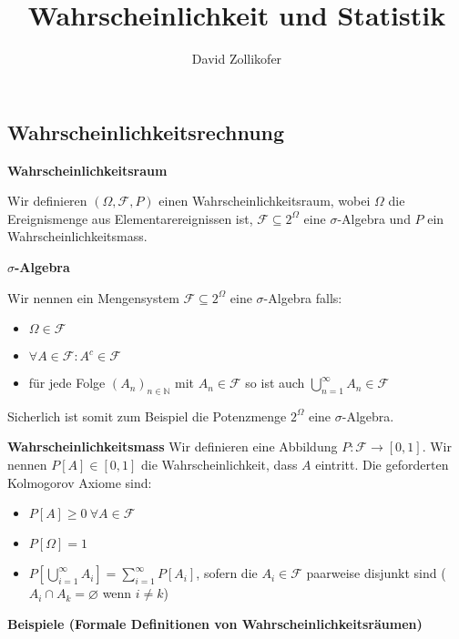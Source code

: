 \documentclass[25pt]{sciposter}
\title{\huge{Wahrscheinlichkeit und Statistik}}
\author{\large{David Zollikofer}}
\newcommand{\N}{\mathbb{N}}
\newcommand{\F}{\mathcal{F}}
\newenvironment{method}[1]{\begin{mdframed}[backgroundcolor=blue!10,innertopmargin=15pt, innerbottommargin=15pt]
		\textbf{#1 }
	}
	{ 
	\end{mdframed}
}
\begin{document}
\maketitle


\begin{multicols}{3}



\section*{Wahrscheinlichkeitsrechnung}

\begin{method}{Wahrscheinlichkeitsraum}
	Wir definieren $(\Omega, \mathcal{F}, P)$ einen Wahrscheinlichkeitsraum, wobei $\Omega$ die Ereignismenge aus Elementarereignissen ist, $\F \subseteq 2^\Omega$ eine $\sigma$-Algebra und $P$ ein Wahrscheinlichkeitsmass.
\end{method}

\begin{method}{$\sigma$-Algebra}
	Wir nennen ein Mengensystem $\F\subseteq 2^\Omega$ eine $\sigma$-Algebra falls:
	\begin{itemize}
		\item $\Omega \in \F$
		\item $\forall A \in \F : A^c \in \F$
		\item für jede Folge $(A_n)_{n\in\N}$ mit $A_n \in \F$ so ist auch $\bigcup_{n=1}^\infty A_n \in \F $
	\end{itemize}

Sicherlich ist somit zum Beispiel die Potenzmenge $2^\Omega$ eine $\sigma$-Algebra.
\end{method}

\begin{method}{Wahrscheinlichkeitsmass} Wir definieren eine Abbildung $P: \F \to [0,1]$. Wir nennen $P[A]\in[0,1]$ die Wahrscheinlichkeit, dass $A$ eintritt. Die geforderten Kolmogorov Axiome sind:
	\begin{itemize}
		\item $P[A]\geq 0 \ \forall A \in \F$
		\item $P[\Omega] = 1$
		\item $P\left[ \bigcup_{i=1}^{\infty} A_i \right] = \sum_{i=1}^{\infty}P[A_i]$, sofern die $A_i \in \F$ paarweise disjunkt sind ($A_i \cap A_k = \varnothing$ wenn $i \neq k$) 
	\end{itemize}
\end{method}

\textbf{Beispiele (Formale Definitionen von Wahrscheinlichkeitsräumen)}




\end{multicols}
\end{document}
